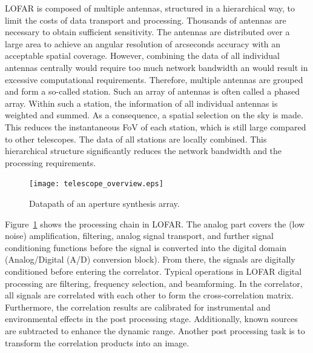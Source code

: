 \documentclass[journal]{IEEEtran}
\begin{document}

LOFAR is composed of multiple antennas, structured in a hierarchical way,
to limit the costs of data transport and processing.
Thousands of antennas are necessary to obtain sufficient sensitivity.
The antennas are distributed over a large area to achieve an angular
resolution of arcseconds accuracy with an acceptable spatial coverage.
However, combining the data of all individual antennas centrally would
require too much network bandwidth an would result in excessive computational
requirements.
Therefore, multiple antennas are grouped and form a so-called station.
Such an array of antennas is often called a phased array.
Within such a station, the information of all individual antennas is weighted
and summed.
As a consequence, a spatial selection on the sky is made.
This reduces the instantaneous FoV of each station, which is still large
compared to other telescopes.
The data of all stations are locally combined.
This hierarchical structure significantly reduces the network bandwidth and
the processing requirements.

\begin{figure}
\begin{center}
\texttt{[image: telescope\_overview.eps]}
\end{center}
\caption{Datapath of an aperture synthesis array.}
\label{fig:concept}
\end{figure}

Figure~\ref{fig:concept} shows the processing chain in LOFAR.
The analog part covers the (low noise) amplification, filtering, analog signal
transport, and further signal conditioning functions before the signal is
converted into the digital domain (Analog/Digital (A/D) conversion block).
From there, the signals are digitally conditioned before entering the correlator. Typical operations in LOFAR digital processing are filtering, frequency selection, and beamforming. In the correlator, all signals are correlated with each other to form the cross-correlation matrix. Furthermore, the correlation results are calibrated for instrumental and environmental effects in the post processing stage. Additionally, known sources are subtracted to enhance the dynamic range. Another post processing task is to transform the correlation products into an image.
\end{document}
